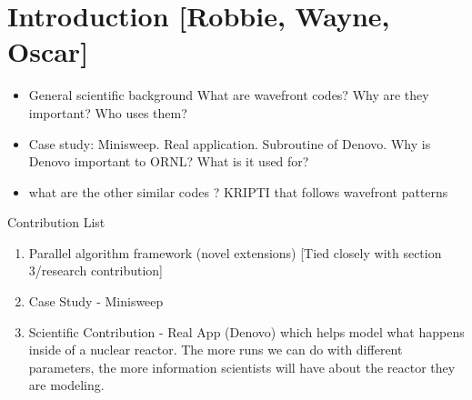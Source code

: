 \section{Introduction [Robbie, Wayne, Oscar]}
\begin{itemize}
  \item General scientific background What are wavefront codes? Why
    are they important? Who uses them?
  \item Case study: Minisweep. Real application. Subroutine of
    Denovo. Why is Denovo important to ORNL? What is it used for?
  \item what are the other similar codes ? KRIPTI that follows
    wavefront patterns
\end{itemize}

Contribution List
\begin{enumerate}
  \item Parallel algorithm framework (novel extensions) [Tied closely
    with section 3/research contribution]
  \item Case Study - Minisweep
  \item Scientific Contribution - Real App (Denovo) which helps model
    what happens inside of a nuclear reactor. The more runs we can do
    with different parameters, the more information scientists will
    have about the reactor they are modeling.
\end{enumerate}


